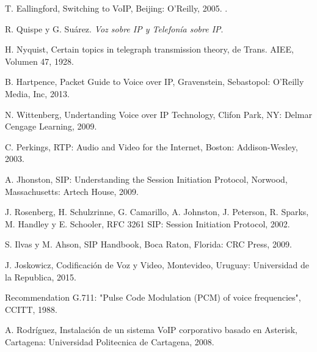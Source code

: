 	\begin{thebibliography}{15}
		T. Eallingford, Switching to VoIP, Beijing: O'Reilly, 2005. .
		
		R. Quispe y G. Suárez.	
		\textit{ Voz sobre IP y Telefonía sobre IP}.
		
		H. Nyquist, Certain topics in telegraph transmission theory, de Trans. AIEE, Volumen 47, 1928.
		
		B. Hartpence, Packet Guide to Voice over IP, Gravenstein, Sebastopol: O'Reilly Media, Inc, 2013. 
		
		N. Wittenberg, Undertanding Voice over IP Technology, Clifon Park, NY: Delmar Cengage Learning, 2009.
		
		C. Perkings, RTP: Audio and Video for the Internet, Boston: Addison-Wesley, 2003.
		
		A. Jhonston, SIP: Understanding the Session Initiation Protocol, Norwood, Massachusetts: Artech House, 2009.
		
		J. Rosenberg, H. Schulzrinne, G. Camarillo, A. Johnston, J. Peterson, R. Sparks, M. Handley y E. Schooler, RFC 3261 SIP: Session Initiation Protocol, 2002. 
		
		S. Ilvas y M. Ahson, SIP Handbook, Boca Raton, Florida: CRC Press, 2009.
		
		J. Joskowicz, Codificación de Voz y Video, Montevideo, Uruguay: Universidad de la Republica, 2015.
		
		Recommendation G.711: "Pulse Code Modulation (PCM) of voice frequencies", CCITT, 1988.
		
		A. Rodríguez, Instalación de un sistema VoIP corporativo basado en Asterisk, Cartagena: Universidad Politecnica de Cartagena, 2008. 
		
	\end{thebibliography}